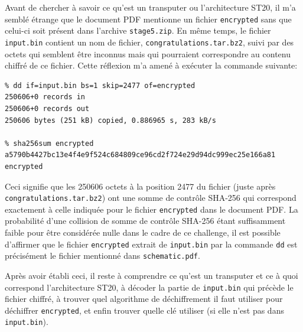 \documentclass[a4paper,10pt]{article}
\begin{document}
Avant de chercher à savoir ce qu'est un transputer ou l'architecture ST20, il m'a semblé étrange que le document PDF mentionne un fichier \texttt{encrypted} sans que celui-ci soit présent dans l'archive \texttt{stage5.zip}.
En même temps, le fichier \texttt{input.bin} contient un nom de fichier, \texttt{congratulations.tar.bz2}, suivi par des octets qui semblent être inconnus mais qui pourraient correspondre au contenu chiffré de ce fichier.
Cette réflexion m'a amené à exécuter la commande suivante:
\begin{verbatim}
% dd if=input.bin bs=1 skip=2477 of=encrypted
250606+0 records in
250606+0 records out
250606 bytes (251 kB) copied, 0.886965 s, 283 kB/s

% sha256sum encrypted
a5790b4427bc13e4f4e9f524c684809ce96cd2f724e29d94dc999ec25e166a81  encrypted
\end{verbatim}

Ceci signifie que les 250606 octets à la position 2477 du fichier (juste après \texttt{congratulations.tar.bz2}) ont une somme de contrôle SHA-256 qui correspond exactement à celle indiquée pour le fichier \texttt{encrypted} dans le document PDF.
La probabilité d'une collision de somme de contrôle SHA-256 étant suffisamment faible pour être considérée nulle dans le cadre de ce challenge, il est possible d'affirmer que le fichier \texttt{encrypted} extrait de \texttt{input.bin} par la commande \texttt{dd} est précisément le fichier mentionné dans \texttt{schematic.pdf}.

Après avoir établi ceci, il reste à comprendre ce qu'est un transputer et ce à quoi correspond l'architecture ST20, à décoder la partie de \texttt{input.bin} qui précède le fichier chiffré, à trouver quel algorithme de déchiffrement il faut utiliser pour déchiffrer \texttt{encrypted}, et enfin trouver quelle clé utiliser (si elle n'est pas dans \texttt{input.bin}).
\end{document}
